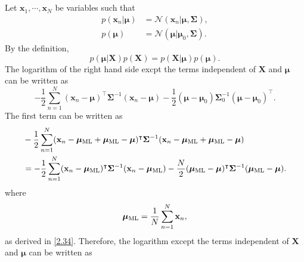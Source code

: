 \subsection{}
\label{2.40}
Let $\mathbf{x}_1, \cdots, \mathbf{x}_N$ be variables such that
%
\begin{equation}
\begin{aligned}
p(\mathbf{x}_n | \bm{\mu})
&=
\mathcal{N}
\left(
	\mathbf{x}_n
	|
	\bm{\mu},
	\bm{\Sigma}	
\right),
\\
p(\bm{\mu})
&=
\mathcal{N}
\left(
	\bm{\mu}
	|
	\bm{\mu}_0,
	\bm{\Sigma}	
\right).
\end{aligned}
\end{equation}
%
By the definition,
%
\begin{equation}
p(\bm{\mu} | \mathbf{X})
p(\mathbf{X})
=
p(\mathbf{X} | \bm{\mu})
p(\bm{\mu}).
\end{equation}
%
The logarithm of the right hand side excpt the terms independent of $\mathbf{X}$ and $\bm{\mu}$ can be written as
%
\begin{equation}
-
\frac{1}{2}
\sum_{n = 1}^{N}
(\mathbf{x}_n - \bm{\mu}) ^ \intercal
\bm{\Sigma} ^ {- 1}
(\mathbf{x}_n - \bm{\mu})
-
\frac{1}{2}
(\bm{\mu} - \bm{\mu}_0)
\bm{\Sigma}_0 ^ {- 1}
(\bm{\mu} - \bm{\mu}_0) ^ \intercal.
\end{equation}
%
The first term can be written as
%
\begin{equation}
\begin{aligned}
&-
\frac{1}{2}
\sum_{n = 1}^{N}
(\mathbf{x}_n - \bm{\mu}_{\rm ML} + \bm{\mu}_{\rm ML} - \bm{\mu}) ^ \intercal
\bm{\Sigma} ^ {- 1}
(\mathbf{x}_n - \bm{\mu}_{\rm ML} + \bm{\mu}_{\rm ML} - \bm{\mu}) 
\\
&=
-
\frac{1}{2}
\sum_{n = 1}^{N}
(\mathbf{x}_n - \bm{\mu}_{\rm ML}) ^ \intercal
\bm{\Sigma} ^ {- 1}
(\mathbf{x}_n - \bm{\mu}_{\rm ML})
-
\frac{N}{2}
(\bm{\mu}_{\rm ML} - \bm{\mu}) ^ \intercal
\bm{\Sigma} ^ {- 1}
(\bm{\mu}_{\rm ML} - \bm{\mu}).
\end{aligned}
\end{equation}
%
where
%
\begin{equation}
\bm{\mu}_{\rm ML}
=
\frac{1}{N}
\sum_{n = 1}^{N}
\mathbf{x}_n,
\end{equation}
%
as derived in \ref{2.34}.
Therefore, the logarithm except the terms independent of $\mathbf{X}$ and $\bm{\mu}$ can be written as
%
